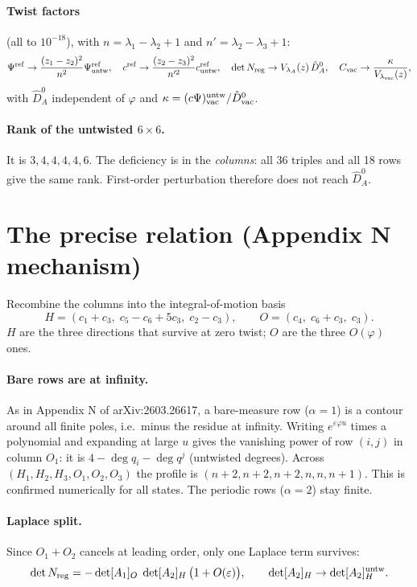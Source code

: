 \documentclass[11pt]{article}
\newcommand{\eps}{\varepsilon}
\newcommand{\vac}{{\rm vac}}
\newcommand{\untw}{{\rm untw}}
\begin{document}
\paragraph{Twist factors} (all to $10^{-18}$), with $n=\lambda_1-\lambda_2+1$ and $n'=\lambda_2-\lambda_3+1$:
\begin{equation}
\Psi^{\rm ref}\to\frac{(z_1-z_2)^2}{n^2}\Psi^{\rm ref}_\untw,\quad
c^{\rm ref}\to\frac{(z_2-z_3)^2}{n'^2}c^{\rm ref}_\untw,\quad
\det N_{\rm reg}\to V_{\lambda_A}(z)\,\hat D^0_A,\quad
C_\vac\to\frac{\kappa}{V_{\lambda_\vac}(z)},
\end{equation}
with $\hat D^0_A$ independent of $\varphi$ and $\kappa=(c\Psi)^\untw_\vac/\hat D^0_\vac$.

\paragraph{Rank of the untwisted $6\times6$.} It is $3,4,4,4,4,6$. The deficiency is in the \emph{columns}: all 36 triples and all 18 rows give the same rank. First-order perturbation therefore does not reach $\hat D^0_A$.

\section{The precise relation (Appendix N mechanism)}

Recombine the columns into the integral-of-motion basis
\begin{equation}
H=(c_1+c_3,\;c_5-c_6+5c_3,\;c_2-c_3),\qquad O=(c_4,\;c_6+c_3,\;c_3).
\end{equation}
$H$ are the three directions that survive at zero twist; $O$ are the three $O(\varphi)$ ones.

\paragraph{Bare rows are at infinity.} As in Appendix N of arXiv:2603.26617, a bare-measure row ($\alpha=1$) is a contour around all finite poles, i.e.\ minus the residue at infinity.
Writing $e^{\eps\varphi u}$ times a polynomial and expanding at large $u$ gives the vanishing power of row $(i,j)$ in column $O_1$: it is $4-\deg q_i-\deg q^j$ (untwisted degrees).
Across $(H_1,H_2,H_3,O_1,O_2,O_3)$ the profile is $(n+2,n+2,n+2,n,n,n+1)$. This is confirmed numerically for all states.
The periodic rows ($\alpha=2$) stay finite.

\paragraph{Laplace split.} Since $O_1+O_2$ cancels at leading order, only one Laplace term survives:
\begin{equation}
\det N_{\rm reg}=-\det[A_1]_O\;\det[A_2]_H\,\big(1+O(\eps)\big),\qquad \det[A_2]_H\to\det[A_2]^\untw_H .
\end{equation}
\end{document}
